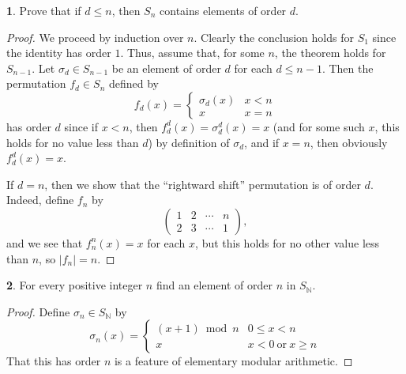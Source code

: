 \documentclass{article}
\theoremstyle{definition}
\newtheorem{ex}{}[section]
\begin{document}
\begin{ex}
	Prove that if $d \leq n$, then $S_n$ contains elements of order $d$.
\end{ex}
\begin{proof}
	We proceed by induction over $n$.
	Clearly the conclusion holds for $S_1$ since the identity has order $1$.
	Thus, assume that, for some $n$, the theorem holds for $S_{n - 1}$.
	Let $\sigma_d \in S_{n-1}$ be an element of order $d$ for each $d \leq n - 1$.
	Then the permutation $f_d \in S_n$ defined by \begin{equation*}
		f_d(x) = \begin{cases}
			\sigma_d(x) & x < n \\
			x           & x = n
		\end{cases}
	\end{equation*}
	has order $d$ since if $x < n$, then $f_d^d(x) = \sigma_d^d(x) = x$ (and for some such $x$, this holds for no value less than $d$) by definition of $\sigma_d$, and if $x = n$, then obviously $f_d^d(x) = x$.

	If $d = n$, then we show that the ``rightward shift'' permutation is of order $d$.
	Indeed, define $f_n$ by \begin{equation*}
		\begin{pmatrix*}
			1 & 2 & \cdots & n \\
			2 & 3 & \cdots & 1
		\end{pmatrix*},
	\end{equation*} and we see that $f_n^n(x) = x$ for each $x$, but this holds for no other value less than $n$, so $|f_n| = n$.
\end{proof}

\begin{ex}
	For every positive integer $n$ find an element of order $n$ in $S_{\mathbb{N}}$.
\end{ex}
\begin{proof}
	Define $\sigma_n \in S_{\mathbb{N}}$ by \begin{equation*}
		\sigma_n(x) = \begin{cases}
			(x + 1) \bmod n & 0 \leq x < n                 \\
			x               & x < 0\ \mathrm{or}\ x \geq n
		\end{cases}
	\end{equation*}
	That this has order $n$ is a feature of elementary modular arithmetic.
\end{proof}
\end{document}
